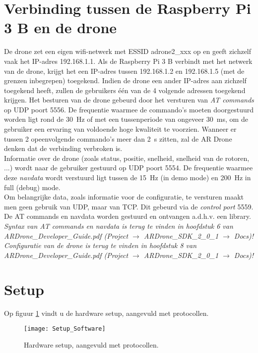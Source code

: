 \section{Verbinding tussen de Raspberry Pi 3 B en de drone} \label{sec:raspberry_drone}
De drone zet een eigen wifi-netwerk met ESSID adrone2\_xxx  op en geeft zichzelf vaak het IP-adres 192.168.1.1.
Als de Raspberry Pi 3 B verbindt met het netwerk van de drone, krijgt het een IP-adres tussen 192.168.1.2 en 192.168.1.5 (met de grenzen inbegrepen) toegekend.
Indien de drone een ander IP-adres aan zichzelf toegekend heeft, zullen de gebruikers één van de 4 volgende adressen toegekend krijgen.
Het besturen van de drone gebeurd door het versturen van \textit{AT commands} op UDP poort 5556.
De frequentie waarmee de commando's moeten doorgestuurd worden ligt rond de \SI{30}{\Hz} of met een tussenperiode van ongeveer \SI{30}{\ms}, om de gebruiker een ervaring van voldoende hoge kwaliteit te voorzien.
Wanneer er tussen 2 opeenvolgende commando's meer dan \SI{2}{\s} zitten, zal de AR Drone denken dat de verbinding verbroken is.\\
Informatie over de drone (zoals status, positie, snelheid, snelheid van de rotoren, ...) wordt naar de gebruiker gestuurd op UDP poort 5554.
De frequentie waarmee deze \textit{navdata} wordt verstuurd ligt tussen de \SI{15}{\Hz} (in demo mode) en \SI{200}{\Hz} in full (debug) mode.\\
Om belangrijke data, zoals informatie voor de configuratie, te versturen maakt men geen gebruik van UDP, maar van TCP.
Dit gebeurd via de \textit{control port} 5559. \cite{developer_guide2012}\\
De AT commands en navdata worden gestuurd en ontvangen a.d.h.v. een library.\\

\textit{Syntax van AT commands en navdata is terug te vinden in hoofdstuk 6 van ARDrone\_Developer\_Guide.pdf (Project $\to$ ARDrone\_SDK\_2\_0\_1 $\to$ Docs)!}\\
\textit{Configuratie van de drone is terug te vinden in hoofdstuk 8 van ARDrone\_Developer\_Guide.pdf (Project $\to$ ARDrone\_SDK\_2\_0\_1 $\to$ Docs)!}

\section{Setup} \label{sec:setup_software}
Op figuur \ref{fig:setup_software} vindt u de hardware setup, aangevuld met protocollen.
\begin{figure}[p]
	\centering
	\texttt{[image: Setup\_Software]}
	\caption[Hardware setup, aangevuld met protocollen]{Hardware setup, aangevuld met protocollen.}
	\label{fig:setup_software}
\end{figure}
